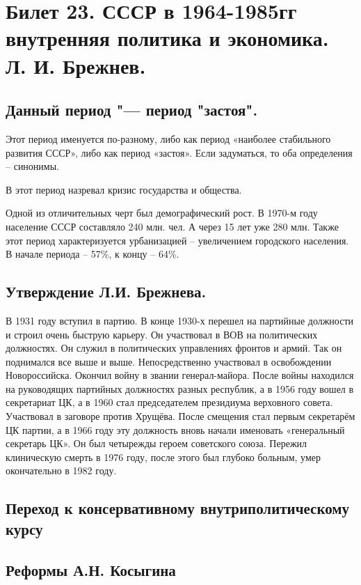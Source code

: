 \section{Билет 23. СССР в 1964-1985гг внутренняя политика и экономика. Л. И. Брежнев.}

\subsection{Данный период "--- период "застоя".}

Этот период именуется по-разному, либо как период «наиболее стабильного развития СССР», либо как период «застоя». Если задуматься, то оба определения – синонимы. 

В этот период назревал кризис государства и общества. 

Одной из отличительных черт был демографический рост. В 1970-м году население СССР составляло 240 млн. чел. А через 15 лет уже 280 млн. Также этот период характеризуется урбанизацией – увеличением городского населения. В начале периода – 57\%, к концу – 64\%.

\subsection{Утверждение Л.И. Брежнева.}

В 1931 году вступил в партию. В конце 1930-х перешел на партийные должности и строил очень быструю карьеру. Он участвовал в ВОВ на политических должностях. Он служил в политических управлениях фронтов и армий. Так он поднимался все выше и выше. Непосредственно участвовал в освобождении Новороссийска. Окончил войну в звании генерал-майора. После войны находился на руководящих партийных должностях разных республик, а в 1956 году вошел в секретариат ЦК, а в 1960 стал председателем президиума верховного совета. Участвовал в заговоре против Хрущёва. После смещения стал первым секретарём ЦК партии, а в 1966 году эту должность вновь начали именовать «генеральный секретарь ЦК». Он был четырежды героем советского союза. Пережил клиническую смерть в 1976 году, после этого был глубоко больным, умер окончательно в 1982 году. 

\subsection{Переход к консервативному внутриполитическому курсу}

\subsection{Реформы А.Н. Косыгина}

